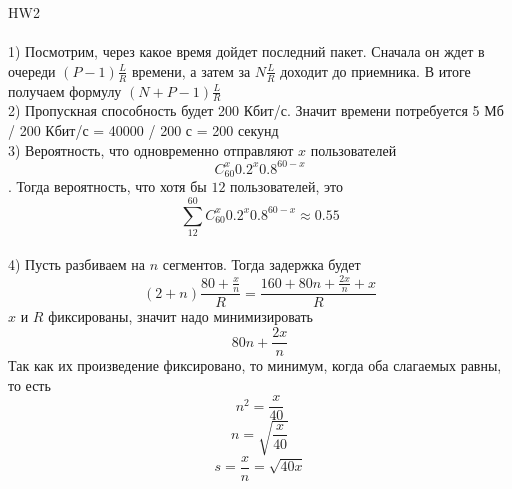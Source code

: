 \documentclass[a4paper,11pt]{article}
\begin{document}
\Large
HW2 \\\\
1) Посмотрим, через какое время дойдет последний пакет. Сначала он ждет в очереди $(P - 1) \frac{L}{R}$ времени, а затем за $N \frac{L}{R}$ доходит до приемника. В итоге получаем формулу $(N + P - 1) \frac{L}{R}$ 
\\
2) Пропускная способность будет 200 Кбит/с. Значит времени потребуется 5 Мб / 200 Кбит/с = 40000 / 200 с = 200 секунд
\\
3) Вероятность, что одновременно отправляют $x$ пользователей $$C_{60}^x 0.2^x 0.8^{60 - x}$$. Тогда вероятность, что хотя бы $12$ пользователей, это $$\sum_{12}^{60} C_{60}^x 0.2^x 0.8^{60 - x} \approx 0.55$$
\\
4) Пусть разбиваем на $n$ сегментов. Тогда задержка будет $$(2 + n) \frac{80 + \frac{x}{n}}{R} = \frac{160 + 80n + \frac{2x}{n} + x}{R}$$ 
$x$ и $R$ фиксированы, значит надо минимизировать $$80n + \frac{2x}{n}$$ Так как их произведение фиксировано, то минимум, когда оба слагаемых равны, то есть $$n^2 = \frac{x}{40}$$ $$n = \sqrt{\frac{x}{40}}$$ $$ s = \frac{x}{n} = \sqrt{40x}$$
\end{document}
